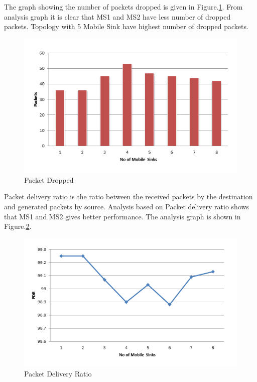 \documentclass[MTech]{iitmdiss}
\begin{document}
The graph showing the number of packets dropped is given in Figure.\ref{p2}. From analysis graph it is clear that MS1 and MS2 have less number of dropped packets. Topology with 5 Mobile Sink have highest number of dropped packets.

\begin{figure}
\center
\includegraphics[scale=0.75]{PacketDropped.PNG}
\caption{Packet Dropped}
\label{p2}
\end{figure}
Packet delivery ratio is the ratio between the received packets by the destination and generated packets by source. Analysis based on Packet delivery ratio shows that MS1 and MS2 gives better performance. The analysis graph is shown in Figure.\ref{a1}.
\begin{figure}
\center
\includegraphics[scale=0.75]{PacketDeliveryRatio.PNG}
\caption{Packet Delivery Ratio}
\label{a1}
\end{figure}\\
\end{document}
